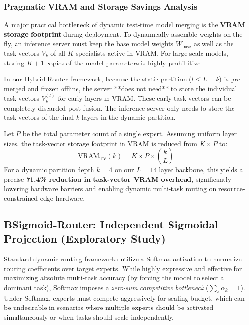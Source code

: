 \subsubsection{Pragmatic VRAM and Storage Savings Analysis}
A major practical bottleneck of dynamic test-time model merging is the \textbf{VRAM storage footprint} during deployment. To dynamically assemble weights on-the-fly, an inference server must keep the base model weights $W_{\text{base}}$ as well as the task vectors $V_k$ of all $K$ specialists active in VRAM. For large-scale models, storing $K+1$ copies of the model parameters is highly prohibitive.

In our Hybrid-Router framework, because the static partition ($l \le L-k$) is pre-merged and frozen offline, the server **does not need** to store the individual task vectors $V_k^{(l)}$ for early layers in VRAM. These early task vectors can be completely discarded post-fusion. The inference server only needs to store the task vectors of the final $k$ layers in the dynamic partition. 

Let $P$ be the total parameter count of a single expert. Assuming uniform layer sizes, the task-vector storage footprint in VRAM is reduced from $K \times P$ to:
\begin{equation}
    \text{VRAM}_{\text{TV}}(k) = K \times P \times \left( \frac{k}{L} \right)
\end{equation}
For a dynamic partition depth $k=4$ on our $L=14$ layer backbone, this yields a precise \textbf{71.4\% reduction in task-vector VRAM overhead}, significantly lowering hardware barriers and enabling dynamic multi-task routing on resource-constrained edge hardware.

\subsection{BSigmoid-Router: Independent Sigmoidal Projection (Exploratory Study)}
Standard dynamic routing frameworks utilize a Softmax activation to normalize routing coefficients over target experts. While highly expressive and effective for maximizing absolute multi-task accuracy (by forcing the model to select a dominant task), Softmax imposes a \emph{zero-sum competitive bottleneck} ($\sum_k \alpha_k = 1$). Under Softmax, experts must compete aggressively for scaling budget, which can be undesirable in scenarios where multiple experts should be activated simultaneously or when tasks should scale independently.

